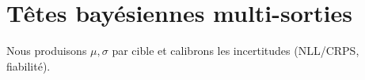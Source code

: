 
\section{Têtes bayésiennes multi-sorties}
Nous produisons $\mu,\sigma$ par cible et calibrons les incertitudes (NLL/CRPS, fiabilité).